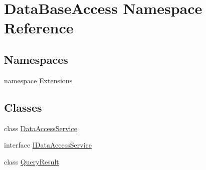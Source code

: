 \hypertarget{namespaceDataBaseAccess}{}\section{Data\+Base\+Access Namespace Reference}
\label{namespaceDataBaseAccess}
\subsection*{Namespaces}
\begin{DoxyCompactItemize}
\item 
namespace \mbox{\hyperlink{namespaceDataBaseAccess_1_1Extensions}{Extensions}}
\end{DoxyCompactItemize}
\subsection*{Classes}
\begin{DoxyCompactItemize}
\item 
class \mbox{\hyperlink{classDataBaseAccess_1_1DataAccessService}{Data\+Access\+Service}}
\item 
interface \mbox{\hyperlink{interfaceDataBaseAccess_1_1IDataAccessService}{I\+Data\+Access\+Service}}
\item 
class \mbox{\hyperlink{classDataBaseAccess_1_1QueryResult}{Query\+Result}}
\end{DoxyCompactItemize}
